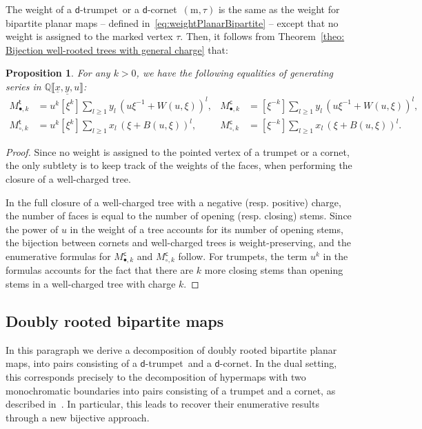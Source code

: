 \documentclass[11pt,reqno,tbtags]{amsart}
\providecommand{\Q}{}
\renewcommand{\Q}{\mathbb{Q}}
\renewcommand{\rm}{\mathrm{m}}
\newcommand{\ux}{\underline{x}}
\newcommand{\uy}{\underline{y}}
\newtheorem{prop}[theo]{Proposition}
\numberwithin{equation}{section}
\numberwithin{theo}{section}
\theoremstyle{definition}
\newcommand{\dtrum}{$\mathsf{d}$-trumpet}
\newcommand{\dcorn}{$\mathsf{d}$-cornet}
\begin{document}
The weight of a \dtrum~or a \dcorn~$(\rm,\tau)$ is the same as the weight for bipartite planar maps -- defined in~\eqref{eq:weightPlanarBipartite} -- except that no weight is assigned to the marked vertex $\tau$. Then, it follows  from Theorem~\ref{theo: Bijection well-rooted trees with general charge} that: 
\begin{prop}
For any $k>0$,  we have the following equalities of generating series in $\Q\llbracket\ux,\uy,u \rrbracket$:
\begin{align*}
	M^\mathsf{t}_{\bullet,k} &= u^k \left[\xi^k\right] \sum\limits_{l\geq 1} y_l \,(u\xi^{-1} + W(u,\xi))^{l} , &
	M^\mathsf{c}_{\bullet,k} &= \left[\xi^{-k}\right] \sum\limits_{l\geq 1} y_l \,(u\xi^{-1} + W(u,\xi))^{l} ,\\
	M^\mathsf{t}_{\circ,k} &= u^k \left[\xi^k\right] \sum\limits_{l\geq 1} x_l \,(\xi + B(u,\xi))^{l} , &
	M^\mathsf{c}_{\circ,k} &= \left[\xi^{-k}\right] \sum\limits_{l\geq 1} x_l \,(\xi + B(u,\xi))^{l}.
\end{align*}
\end{prop}
\begin{proof}
Since no weight is assigned to the pointed vertex of a trumpet or a cornet, the only subtlety is to keep track of the weights of the faces, when performing the closure of a well-charged tree. 

In the full closure of a well-charged tree with a negative (resp. positive) charge, the number of faces is equal to the number of opening (resp. closing) stems. Since the power of $u$ in the weight of a tree accounts for its number of opening stems, the bijection between cornets and well-charged trees is weight-preserving, and the enumerative formulas for $M^\mathsf{c}_{\bullet,k}$ and $M^\mathsf{c}_{\circ,k}$ follow. For trumpets, the term $u^k$ in the formulas accounts for the fact that there are $k$ more closing stems than opening stems in a well-charged tree with charge $k$.
\end{proof}

	\subsection{Doubly rooted bipartite maps} 

In this paragraph we derive a decomposition of doubly rooted bipartite planar maps, into pairs consisting of a \dtrum~and a \dcorn. In the dual setting, this corresponds precisely to the decomposition of hypermaps with two monochromatic boundaries into pairs consisting of a trumpet and a cornet, as described in~\cite[Section~3.3]{AlbenqueBouttier_slices}. In particular, this leads to recover their enumerative results through a new bijective approach. 
\end{document}
